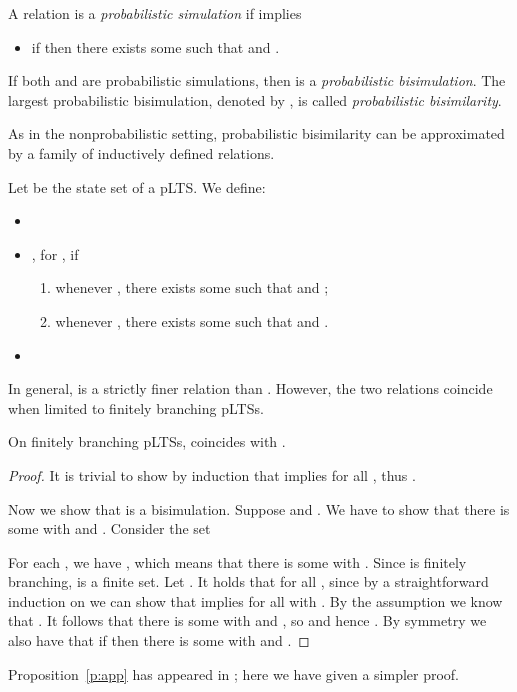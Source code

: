 \documentclass{article}
\begin{document}
\begin{definition}\label{d:sbisi2}
A relation  is a {\em probabilistic
  simulation} if  implies
\begin{itemize}
\item if  then there exists some  such that
   and .
\end{itemize}
If both  and  are probabilistic simulations, then
 is a {\em
  probabilistic bisimulation}. The largest probabilistic
  bisimulation, denoted by , is called \emph{probabilistic
  bisimilarity}.
\end{definition}



As in the nonprobabilistic setting, probabilistic bisimilarity can
be approximated by a family of inductively defined relations.
\begin{definition}
Let  be the state set of a pLTS. We define:
\begin{itemize}
\item 
\item , for , if
\begin{enumerate}
\item whenever , there exists some  such
that  and ;
\item whenever , there exists some  such
that  and .
\end{enumerate}
\item 
\end{itemize}
\end{definition}
In general,  is a strictly finer relation than
. However, the two relations coincide when limited to
finitely branching pLTSs.
\begin{proposition}\label{p:app}
On finitely branching pLTSs,  coincides with .
\end{proposition}
\begin{proof}
It is trivial to show by induction that  implies  for all , thus .

Now we show that  is a bisimulation. Suppose
 and . We have to show that there is
some  with  and . Consider the set

For each , we have , which means that there is some  with
. Since  is finitely
branching,  is a finite set. Let . It holds that  for all
, since by a straightforward induction on  we can
show that  implies  for all  with
. By the assumption  we know that
. It follows that there is some  with
 and , so  and hence . By symmetry we also
have that if  then there is some  with
 and .
\end{proof}
Proposition~\ref{p:app} has appeared in \cite{Bai98}; here we have
given a simpler proof.
\end{document}
